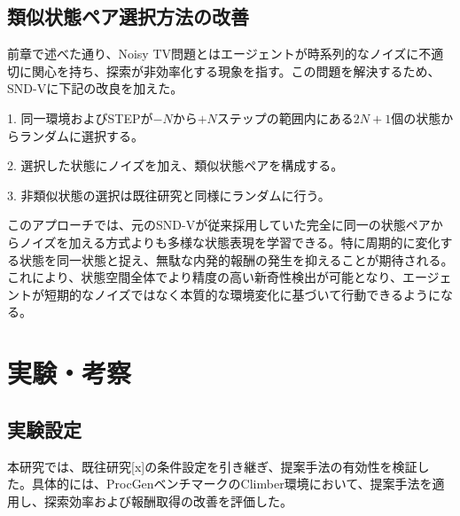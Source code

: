 \subsection{類似状態ペア選択方法の改善}
前章で述べた通り、Noisy TV問題とはエージェントが時系列的なノイズに不適切に関心を持ち、探索が非効率化する現象を指す。この問題を解決するため、SND-Vに下記の改良を加えた。

1. 同一環境およびSTEPが\(-N\)から\(+N\)ステップの範囲内にある\(2N+1\)個の状態からランダムに選択する。

2. 選択した状態にノイズを加え、類似状態ペアを構成する。

3. 非類似状態の選択は既往研究と同様にランダムに行う。

このアプローチでは、元のSND-Vが従来採用していた完全に同一の状態ペアからノイズを加える方式よりも多様な状態表現を学習できる。特に周期的に変化する状態を同一状態と捉え、無駄な内発的報酬の発生を抑えることが期待される。これにより、状態空間全体でより精度の高い新奇性検出が可能となり、エージェントが短期的なノイズではなく本質的な環境変化に基づいて行動できるようになる。

\section{実験・考察}

\subsection{実験設定}
本研究では、既往研究[x]の条件設定を引き継ぎ、提案手法の有効性を検証した。具体的には、ProcGenベンチマークのClimber環境において、提案手法を適用し、探索効率および報酬取得の改善を評価した。

